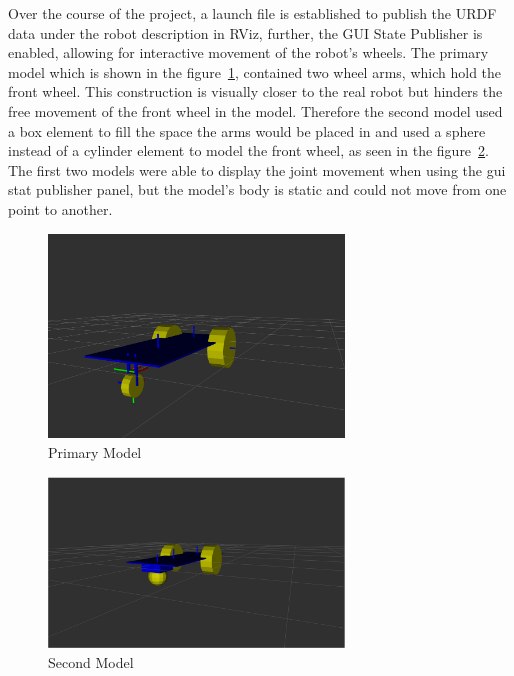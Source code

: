 

Over the course of the project, a launch file is established to publish the URDF data under the robot description in RViz, further, the GUI State Publisher is enabled, allowing for interactive movement of the robot's wheels. The primary model which is shown in the figure~\ref{fig:primary_model}, contained two wheel arms, which hold the front wheel. This construction is visually closer to the real robot but hinders the free movement of the front wheel in the model. Therefore the second model used a box element to fill the space the arms would be placed in and used a sphere instead of a cylinder element to model the front wheel, as seen in the figure~\ref{fig:second_model}. The first two models were able to display the joint movement when using the gui stat publisher panel, but the model's body is static and could not move from one point to another.


\begin{figure}[h]
    \centering
    \includegraphics[width=0.7\textwidth]{Figures/fir_side.png}
    \caption{Primary Model}
    \label{fig:primary_model}
\end{figure}

\begin{figure}[h]
    \centering
    \includegraphics[width=0.7\textwidth]{Figures/sec_side.png}
    \caption{Second Model}
    \label{fig:second_model}
\end{figure}

